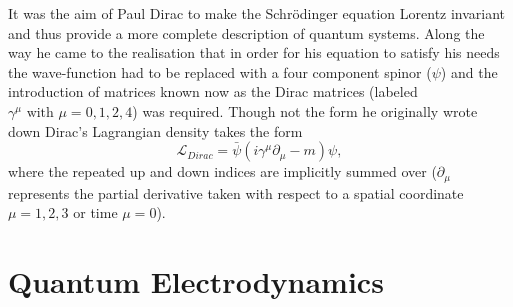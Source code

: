 It was the aim of Paul Dirac to make the Schr\"odinger equation Lorentz
invariant and thus provide a more complete description of quantum systems. Along
the way he came to the realisation that in order for his equation to satisfy his
needs the wave-function had to be replaced with a four component spinor ($\psi$)
and the introduction of matrices known now as the Dirac matrices (labeled
$\gamma^{\mu} \text{ with } \mu=0,1,2,4$) was required. Though not the form he
originally wrote down Dirac's Lagrangian density takes the form
  \begin{equation}
    \label{eq:dirac} \mathcal{L}_{Dirac} =
\bar{\psi}(i\gamma^{\mu}\partial_{\mu} - m)\psi,
  \end{equation} where the repeated up and down indices are implicitly summed
over ($\partial_{\mu}$ represents the partial derivative taken with respect to a
spatial coordinate $\mu = 1,2,3$ or time $\mu = 0$).

\section{Quantum Electrodynamics}

